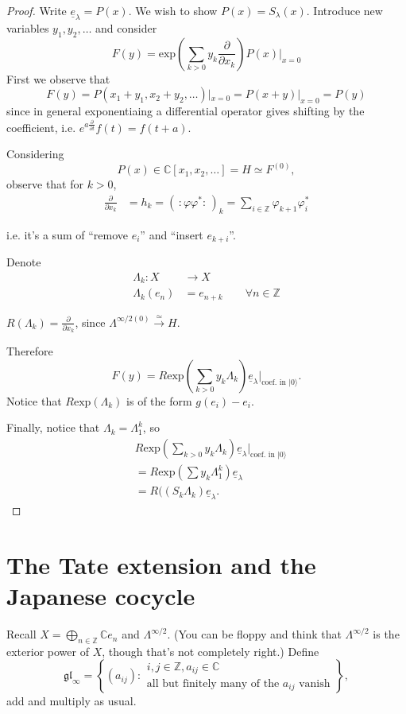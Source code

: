 \begin{proof}
Write $\underline{e}_\lambda=P(x)$.
We wish to show $P(x)=S_\lambda(x)$.
Introduce new variables $y_1,y_2,\ldots$ and
consider
$$
F(y)=\text{exp}
\left(\sum_{k>0}y_k\frac{\partial }{\partial x_k}\right)P(x)\Big|_{x=0}
$$
First we observe that
$$
F(y)=P(x_1+y_1,x_2+y_2,\ldots)|_{x=0}=P(x+y)|_{x=0}=P(y)
$$
since in general exponentiaing a differential operator
gives shifting by the coefficient, i.e.
$e^{a \frac{\partial }{\partial t}}f(t)=f(t+a)$.

Considering  
$$
P(x) \in \mathbb{C}[x_1,x_2,\ldots]=H\simeq F^{(0)},
$$
observe that for $k>0$,
\begin{align*}
\frac{\partial }{\partial x_k}&=h_k
=(\,:\!\varphi \varphi^*\!:\,)_k
=\sum_{i \in \mathbb{Z}}\varphi_{k+1}\varphi^*_i
\end{align*}

\noindent
i.e. it's a sum of ``remove $e_i$'' and ``insert $e_{k+i}$''.

Denote
\begin{align*}
\Lambda_k: X &\longrightarrow X \\
\Lambda_k(e_n) &=e_{n+k}\qquad  \forall n \in \mathbb{Z}
\end{align*}

\noindent
$R(\Lambda_k)=\frac{\partial }{\partial x_k}$,
since $\Lambda^{\infty/2(0)}\xrightarrow{\simeq}H$.

Therefore
$$
F(y)=R \text{exp}\left(\sum_{k>0}y_k \Lambda_k\right)
\underline{e}_\lambda\Big|_{\text{coef. in }|0\rangle}.
$$
Notice that $R \text{exp}(\Lambda_k)$ is of the form
$g(e_i)-e_i$.

Finally, notice that $\Lambda_k=\Lambda_1^k$,
so
\begin{align*}
&R \text{exp}\left(\sum_{k>0}y_k \Lambda_k\right)
\underline{e}_\lambda\Big|_{\text{coef. in }|0\rangle}\\
&=R \text{exp}\left(\sum y_k \Lambda_1^k\right)\underline{e}_\lambda\\
&=R(\left(S_k \Lambda_k\right)\underline{e}_\lambda.
\end{align*}
\end{proof}


\section{The Tate extension and the Japanese cocycle}
\label{section-tate-extension-and-japanese-cocycle}

\noindent
Recall $X=\bigoplus_{n \in \mathbb{Z}}\mathbb{C}e_n$
and $\Lambda^{\infty/2}$.
(You can be floppy and think that $\Lambda^{\infty/2}$ 
is the exterior power of $X$,
though that's not completely right.)
Define
$$
\mathfrak{gl}_\infty
=\left\{(a_{ij}):\substack{i,j \in \mathbb{Z},a_{ij}\in \mathbb{C} \\ 
\text{all but finitely many of the $a_{ij}$ vanish}}\right\},
$$
add and multiply as usual.

